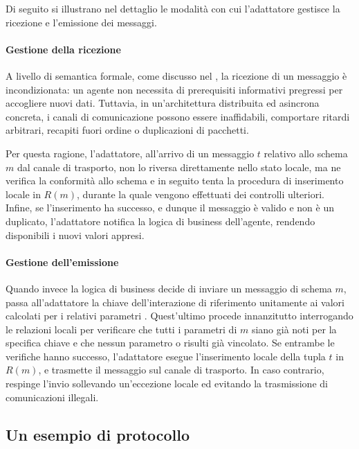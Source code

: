 Di seguito si illustrano nel dettaglio le modalità con cui l'adattatore gestisce la ricezione e l'emissione dei messaggi. 

\paragraph{Gestione della ricezione}
A livello di semantica formale, come discusso nel , la ricezione 
di un messaggio è incondizionata: un agente non necessita di prerequisiti 
informativi pregressi per accogliere nuovi dati. Tuttavia, in un'architettura 
distribuita ed asincrona concreta, i canali di comunicazione possono essere inaffidabili, 
comportare ritardi arbitrari, recapiti fuori ordine o duplicazioni di pacchetti.

Per questa ragione, l'adattatore, all'arrivo 
di un messaggio $t$ relativo allo schema $m$ dal canale di trasporto, non lo riversa 
direttamente nello stato locale, ma ne verifica la conformità allo schema e in seguito
tenta la procedura di inserimento locale in $R(m)$, durante la quale vengono effettuati dei
controlli ulteriori.
Infine, se l'inserimento ha successo, e dunque il messaggio è valido e non
è un duplicato, l'adattatore notifica la logica di business dell'agente, rendendo 
disponibili i nuovi valori appresi.

\paragraph{Gestione dell'emissione}
Quando invece la logica di business decide di inviare un messaggio di schema $m$, passa all'adattatore la chiave dell'interazione di riferimento
unitamente ai valori calcolati per i relativi parametri .
Quest'ultimo procede innanzitutto interrogando le relazioni locali per verificare che tutti i parametri 
di $m$ siano già noti per la specifica chiave e che nessun parametro 
o  risulti già vincolato. 
Se entrambe le verifiche hanno successo, l'adattatore esegue l'inserimento locale della tupla $t$ in $R(m)$,
e trasmette il messaggio sul canale di trasporto. 
In caso contrario, respinge l'invio sollevando un'eccezione locale ed evitando la trasmissione di comunicazioni illegali.

\subsection{Un esempio di protocollo}\label{bspl:esempio-finale}


